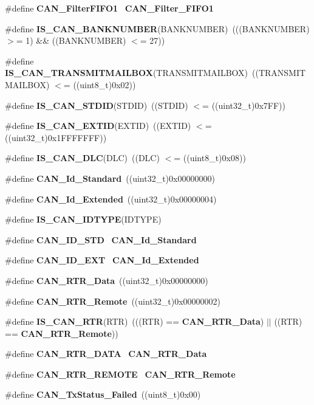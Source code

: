 \begin{DoxyCompactItemize}
\#define \textbf{ C\+A\+N\+\_\+\+Filter\+F\+I\+F\+O1}~\textbf{ C\+A\+N\+\_\+\+Filter\+\_\+\+F\+I\+F\+O1}
\item 
\#define \textbf{ I\+S\+\_\+\+C\+A\+N\+\_\+\+B\+A\+N\+K\+N\+U\+M\+B\+ER}(B\+A\+N\+K\+N\+U\+M\+B\+ER)~(((B\+A\+N\+K\+N\+U\+M\+B\+ER) $>$= 1) \&\& ((B\+A\+N\+K\+N\+U\+M\+B\+ER) $<$= 27))
\item 
\#define \textbf{ I\+S\+\_\+\+C\+A\+N\+\_\+\+T\+R\+A\+N\+S\+M\+I\+T\+M\+A\+I\+L\+B\+OX}(T\+R\+A\+N\+S\+M\+I\+T\+M\+A\+I\+L\+B\+OX)~((T\+R\+A\+N\+S\+M\+I\+T\+M\+A\+I\+L\+B\+OX) $<$= ((uint8\+\_\+t)0x02))
\item 
\#define \textbf{ I\+S\+\_\+\+C\+A\+N\+\_\+\+S\+T\+D\+ID}(S\+T\+D\+ID)~((S\+T\+D\+ID) $<$= ((uint32\+\_\+t)0x7\+F\+F))
\item 
\#define \textbf{ I\+S\+\_\+\+C\+A\+N\+\_\+\+E\+X\+T\+ID}(E\+X\+T\+ID)~((E\+X\+T\+ID) $<$= ((uint32\+\_\+t)0x1\+F\+F\+F\+F\+F\+F\+F))
\item 
\#define \textbf{ I\+S\+\_\+\+C\+A\+N\+\_\+\+D\+LC}(D\+LC)~((D\+LC) $<$= ((uint8\+\_\+t)0x08))
\item 
\#define \textbf{ C\+A\+N\+\_\+\+Id\+\_\+\+Standard}~((uint32\+\_\+t)0x00000000)
\item 
\#define \textbf{ C\+A\+N\+\_\+\+Id\+\_\+\+Extended}~((uint32\+\_\+t)0x00000004)
\item 
\#define \textbf{ I\+S\+\_\+\+C\+A\+N\+\_\+\+I\+D\+T\+Y\+PE}(I\+D\+T\+Y\+PE)
\item 
\#define \textbf{ C\+A\+N\+\_\+\+I\+D\+\_\+\+S\+TD}~\textbf{ C\+A\+N\+\_\+\+Id\+\_\+\+Standard}
\item 
\#define \textbf{ C\+A\+N\+\_\+\+I\+D\+\_\+\+E\+XT}~\textbf{ C\+A\+N\+\_\+\+Id\+\_\+\+Extended}
\item 
\#define \textbf{ C\+A\+N\+\_\+\+R\+T\+R\+\_\+\+Data}~((uint32\+\_\+t)0x00000000)
\item 
\#define \textbf{ C\+A\+N\+\_\+\+R\+T\+R\+\_\+\+Remote}~((uint32\+\_\+t)0x00000002)
\item 
\#define \textbf{ I\+S\+\_\+\+C\+A\+N\+\_\+\+R\+TR}(R\+TR)~(((R\+TR) == \textbf{ C\+A\+N\+\_\+\+R\+T\+R\+\_\+\+Data}) $\vert$$\vert$ ((R\+TR) == \textbf{ C\+A\+N\+\_\+\+R\+T\+R\+\_\+\+Remote}))
\item 
\#define \textbf{ C\+A\+N\+\_\+\+R\+T\+R\+\_\+\+D\+A\+TA}~\textbf{ C\+A\+N\+\_\+\+R\+T\+R\+\_\+\+Data}
\item 
\#define \textbf{ C\+A\+N\+\_\+\+R\+T\+R\+\_\+\+R\+E\+M\+O\+TE}~\textbf{ C\+A\+N\+\_\+\+R\+T\+R\+\_\+\+Remote}
\item 
\#define \textbf{ C\+A\+N\+\_\+\+Tx\+Status\+\_\+\+Failed}~((uint8\+\_\+t)0x00)
$$
\end{DoxyCompactItemize}
